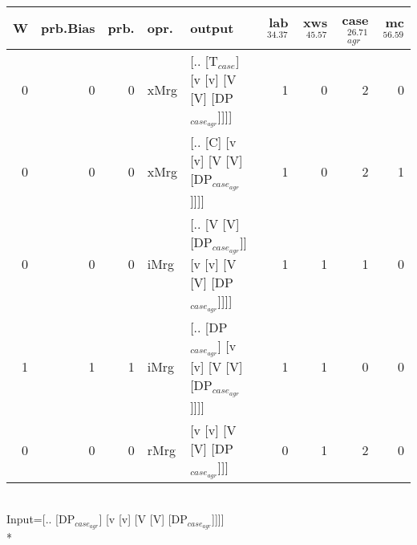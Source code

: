 \begin{tabularx}{\linewidth}{rrrlXrrrr}
\hline
   W &   prb.Bias &   prb. & opr.   & output                                                   &   lab$^{34.37}$ &   xws$^{45.57}$ &   case$_{agr}^{26.71}$ &   mc$^{56.59}$ \\
\hline
   0 &       0 &   0 & xMrg & [.. [T$_{case}$] [v [v] [V [V] [DP$_{case_{agr}}$]]]]              &             1 &             0 &                  2 &            0 \\
   0 &       0 &   0 & xMrg & [.. [C] [v [v] [V [V] [DP$_{case_{agr}}$]]]]                   &             1 &             0 &                  2 &            1 \\
   0 &       0 &   0 & iMrg & [.. [V [V] [DP$_{case_{agr}}$]] [v [v] [V [V] [DP$_{case_{agr}}$]]]] &             1 &             1 &                  1 &            0 \\
   1 &       1 &   1 & iMrg & [.. [DP$_{case_{agr}}$] [v [v] [V [V] [DP$_{case_{agr}}$]]]]         &             1 &             1 &                  0 &            0 \\
   0 &       0 &   0 & rMrg & [v [v] [V [V] [DP$_{case_{agr}}$]]]                            &             0 &             1 &                  2 &            0 \\
\hline
\end{tabularx}\endgroup\\
\begingroup\scriptsize Input=[.. [DP$_{case_{agr}}$] [v [v] [V [V] [DP$_{case_{agr}}$]]]]\\*
